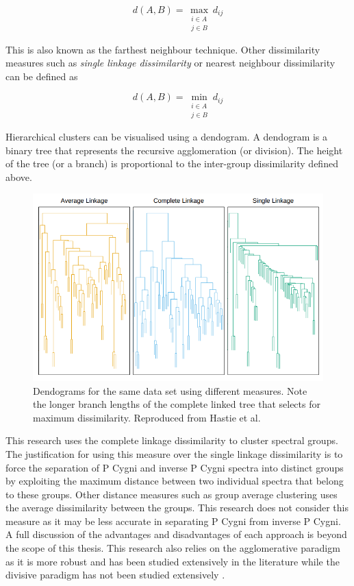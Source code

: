 \begin{equation}
    d(A,B) = \max_{\substack{i \in A \\ j \in B}} d_{ij}
\end{equation}

This is also known as the farthest neighbour technique. Other dissimilarity measures such as \emph{single linkage dissimilarity} or nearest neighbour dissimilarity can be defined as

\begin{equation}
    d(A,B) = \min_{\substack{i \in A \\ j \in B}} d_{ij}
\end{equation}

Hierarchical clusters can be visualised using a dendogram. A dendogram is a binary tree that represents the recursive agglomeration (or division). The height of the tree (or a branch) is proportional to the inter-group dissimilarity defined above. 

\begin{figure}[h]
\centering
\includegraphics[scale=0.60]{figures/complete linkage.png}
\caption{Dendograms for the same data set using different measures. Note the longer branch lengths of the complete linked tree that selects for maximum dissimilarity. Reproduced from Hastie et al.\cite{hastie2009elements}}
\end{figure}

This research uses the complete linkage dissimilarity to cluster spectral groups. The justification for using this measure over the single linkage dissimilarity is to force the separation of P Cygni and inverse P Cygni spectra into distinct groups by exploiting the maximum distance between two individual spectra that belong to these groups. Other distance measures such as group average clustering uses the average dissimilarity between the groups. This research does not consider this measure as it may be less accurate in separating P Cygni from inverse P Cygni. A full discussion of the advantages and disadvantages of each approach is beyond the scope of this thesis. This research also relies on the agglomerative paradigm as it is more robust and has been studied extensively in the literature while the divisive paradigm has not been studied extensively \cite{hastie2009elements}.


